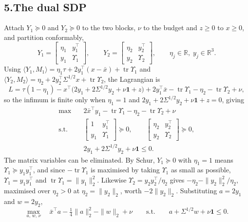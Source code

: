 \documentclass[11pt]{article}
\DeclareMathOperator*{\maximize}{max}
\DeclareMathOperator{\tr}{tr}
\newcommand{\R}{\mathbb{R}}
\newcommand{\T}{^{\!\top}}
\theoremstyle{definition}
\begin{document}
\subsection*{5.\quad The dual SDP}

Attach $Y_1 \succeq 0$ and $Y_2 \succeq 0$ to the two blocks, $\nu$ to
the budget and $z \ge 0$ to $x \ge 0$, and partition conformably,
\[
  Y_1 = \begin{bmatrix} \eta_1 & y_1\T \\ y_1 & \Upsilon_1\end{bmatrix},
  \qquad
  Y_2 = \begin{bmatrix} \eta_2 & y_2\T \\ y_2 & \Upsilon_2\end{bmatrix},
  \qquad \eta_j \in \R,\; y_j \in \R^3 .
\]
Using $\langle Y_1, M_1\rangle = \eta_1 \tau
+ 2y_1\T(x-\bar{x}) + \tr \Upsilon_1$ and
$\langle Y_2, M_2\rangle = \eta_2 + 2y_2\T\Sigma^{1/2}x + \tr\Upsilon_2$,
the Lagrangian is
\[
  L = \tau(1 - \eta_1)
    - x\T\bigl(2y_1 + 2\Sigma^{1/2}y_2 + \nu\mathbf{1} + z\bigr)
    + 2y_1\T\bar{x} - \tr\Upsilon_1 - \eta_2 - \tr\Upsilon_2 + \nu ,
\]
so the infimum is finite only when $\eta_1 = 1$ and
$2y_1 + 2\Sigma^{1/2}y_2 + \nu\mathbf{1} + z = 0$, giving
\begin{equation}\label{eq:p4sdpdual}
\begin{aligned}
  \maximize\quad & 2\bar{x}\T y_1 - \tr\Upsilon_1
    - \eta_2 - \tr\Upsilon_2 + \nu\\
  \text{s.t.}\quad
    & \begin{bmatrix} 1 & y_1\T\\ y_1 & \Upsilon_1\end{bmatrix}
      \succeq 0, \qquad
      \begin{bmatrix} \eta_2 & y_2\T\\ y_2 & \Upsilon_2\end{bmatrix}
      \succeq 0,\\
    & 2y_1 + 2\Sigma^{1/2}y_2 + \nu\mathbf{1} \le 0 .
\end{aligned}
\end{equation}
The matrix variables can be eliminated. By Schur, $Y_1 \succeq 0$ with
$\eta_1 = 1$ means $\Upsilon_1 \succeq y_1 y_1\T$, and since
$-\tr\Upsilon_1$ is maximised by taking $\Upsilon_1$ as small as
possible, $\Upsilon_1 = y_1 y_1\T$ and $\tr\Upsilon_1 = \|y_1\|_2^2$.
Likewise $\Upsilon_2 = y_2 y_2\T/\eta_2$ gives
$-\eta_2 - \|y_2\|_2^2/\eta_2$, maximised over $\eta_2 > 0$ at
$\eta_2 = \|y_2\|_2$, worth $-2\|y_2\|_2$. Substituting $a = 2y_1$ and
$w = 2y_2$,
\begin{equation}\label{eq:p4sdpdual2}
  \maximize_{a,\,w,\,\nu}\quad
    \bar{x}\T a - \tfrac14\|a\|_2^2 - \|w\|_2 + \nu
  \qquad\text{s.t.}\qquad
    a + \Sigma^{1/2} w + \nu \mathbf{1} \le 0 .
\end{equation}
\end{document}
